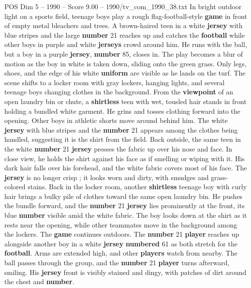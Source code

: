 \begin{textsample}{POS Dim 5 – 1990 – Score 9.00 – 1990/tv\_com\_1990\_38.txt}  \label{ex:f5_pos_015}
In bright outdoor light on a sports field, teenage boys play a rough flag-football-style \textbf{game} in front of empty metal bleachers and trees.
A brown-haired teen in a white \textbf{jersey} with blue stripes and the large \textbf{number} 21 reaches up and catches the \textbf{football} while other boys in purple and white \textbf{jerseys} crowd around him.
He runs with the ball, but a boy in a purple \textbf{jersey}, \textbf{number} 85, closes in.
The play becomes a blur of motion as the boy in white is taken down, sliding onto the green grass.
Only legs, shoes, and the edge of his white \textbf{uniform} are visible as he lands on the turf.
The scene shifts to a locker room with gray lockers, hanging lights, and several teenage boys changing clothes in the background.
From the \textbf{viewpoint} of an open laundry bin or chute, a \textbf{shirtless} teen with wet, tousled hair stands in front holding a bundled white garment.
He grins and tosses clothing forward into the opening.
Other boys in athletic shorts move around behind him.
The white \textbf{jersey} with blue stripes and the \textbf{number} 21 appears among the clothes being handled, suggesting it is the shirt from the field.
Back outside, the same teen in the white \textbf{number} 21 \textbf{jersey} presses the fabric up over his nose and face.
In close view, he holds the shirt against his face as if smelling or wiping with it.
His dark hair falls over his forehead, and the white fabric covers most of his face.
The \textbf{jersey} is no longer crisp ; it looks worn and dirty, with smudges and grass-colored stains.
Back in the locker room, another \textbf{shirtless} teenage boy with curly hair brings a bulky pile of clothes toward the same open laundry bin.
He pushes the bundle forward, and the \textbf{number} 21 \textbf{jersey} lies prominently at the front, its blue \textbf{number} visible amid the white fabric.
The boy looks down at the shirt as it rests near the opening, while other teammates move in the background among the lockers.
The \textbf{game} continues outdoors.
The \textbf{number} 21 \textbf{player} reaches up alongside another boy in a white \textbf{jersey} \textbf{numbered} 61 as both stretch for the \textbf{football}.
Arms are extended high, and other \textbf{players} watch from nearby.
The ball passes through the group, and the \textbf{number} 21 \textbf{player} turns afterward, smiling.
His \textbf{jersey} front is visibly stained and dingy, with patches of dirt around the chest and \textbf{number}.

\end{textsample}
